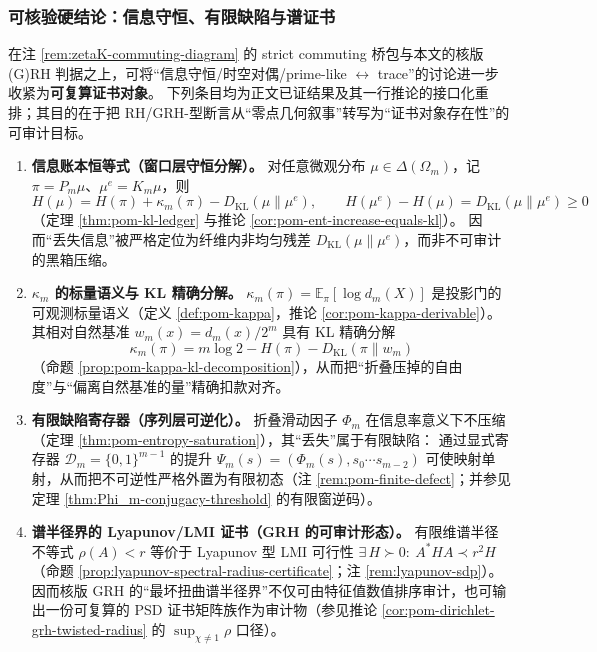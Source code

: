 \subsubsection{可核验硬结论：信息守恒、有限缺陷与谱证书}\label{subsubsec:bridgepack-hard-conclusions}
在注 \ref{rem:zetaK-commuting-diagram} 的 strict commuting 桥包与本文的核版 (G)RH 判据之上，可将“信息守恒/时空对偶/prime-like \(\leftrightarrow\) trace”的讨论进一步收紧为\textbf{可复算证书对象}。
下列条目均为正文已证结果及其一行推论的接口化重排；其目的在于把 RH/GRH-型断言从“零点几何叙事”转写为“证书对象存在性”的可审计目标。
\begin{enumerate}
  \item \textbf{信息账本恒等式（窗口层守恒分解）。}
  对任意微观分布 \(\mu\in\Delta(\Omega_m)\)，记 \(\pi=P_m\mu\)、\(\mu^e=K_m\mu\)，则
  \[
  H(\mu)=H(\pi)+\kappa_m(\pi)-D_{\mathrm{KL}}(\mu\|\mu^e),
  \qquad
  H(\mu^e)-H(\mu)=D_{\mathrm{KL}}(\mu\|\mu^e)\ge 0
  \]
  （定理 \ref{thm:pom-kl-ledger} 与推论 \ref{cor:pom-ent-increase-equals-kl}）。
  因而“丢失信息”被严格定位为纤维内非均匀残差 \(D_{\mathrm{KL}}(\mu\|\mu^e)\)，而非不可审计的黑箱压缩。

  \item \textbf{\texorpdfstring{$\kappa_m$}{kappa} 的标量语义与 KL 精确分解。}
  \(\kappa_m(\pi)=\mathbb{E}_\pi[\log d_m(X)]\) 是投影门的可观测标量语义（定义 \ref{def:pom-kappa}，推论 \ref{cor:pom-kappa-derivable}）。
  其相对自然基准 \(w_m(x)=d_m(x)/2^m\) 具有 KL 精确分解
  \[
  \kappa_m(\pi)=m\log 2-H(\pi)-D_{\mathrm{KL}}(\pi\|w_m)
  \]
  （命题 \ref{prop:pom-kappa-kl-decomposition}），从而把“折叠压掉的自由度”与“偏离自然基准的量”精确扣款对齐。

  \item \textbf{有限缺陷寄存器（序列层可逆化）。}
  折叠滑动因子 \(\Phi_m\) 在信息率意义下不压缩（定理 \ref{thm:pom-entropy-saturation}），其“丢失”属于有限缺陷：
  通过显式寄存器 \(\mathcal{D}_m=\{0,1\}^{m-1}\) 的提升
  \(
  \Psi_m(s)=(\Phi_m(s),s_0\cdots s_{m-2})
  \)
  可使映射单射，从而把不可逆性严格外置为有限初态（注 \ref{rem:pom-finite-defect}；并参见定理 \ref{thm:Phi_m-conjugacy-threshold} 的有限窗逆码）。

  \item \textbf{谱半径界的 Lyapunov/LMI 证书（GRH 的可审计形态）。}
  有限维谱半径不等式 \(\rho(A)<r\) 等价于 Lyapunov 型 LMI 可行性
  \(
  \exists\,H\succ0:\ A^\ast H A\prec r^2H
  \)
  （命题 \ref{prop:lyapunov-spectral-radius-certificate}；注 \ref{rem:lyapunov-sdp}）。
  因而核版 GRH 的“最坏扭曲谱半径界”不仅可由特征值数值排序审计，也可输出一份可复算的 PSD 证书矩阵族作为审计物（参见推论 \ref{cor:pom-dirichlet-grh-twisted-radius} 的 \(\sup_{\chi\ne 1}\rho\) 口径）。


\end{enumerate}
